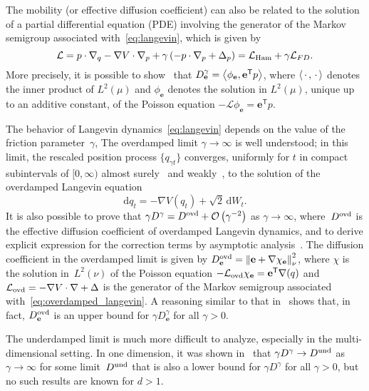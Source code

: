 \documentclass[11pt,a4paper]{article}
\newcommand{\laplacian}{\Delta}
\newcommand{\dummy}{\,\cdot\,}
\newcommand{\grad}{\nabla}
\newcommand{\vect}[1]{\boldsymbol{\mathbf #1}}
\renewcommand{\d}{\mathrm d}
\renewcommand{\t}{\mathsf T}
\theoremstyle{plain}
\numberwithin{equation}{section}
\begin{document}
The mobility (or effective diffusion coefficient)
can also be related to the solution of a partial differential equation (PDE) involving the generator of the Markov semigroup associated with~\eqref{eq:langevin},
which is given by
\begin{equation}
    \label{eq:decomposition_generator}
    \mathcal L
    = p \cdot \grad_q - \grad V \cdot \grad_p + \gamma \left( - p \cdot \grad_p + \laplacian_p \right)
    = \mathcal L_{\rm Ham} + \gamma \mathcal L_{FD}.
\end{equation}
More precisely, it is possible to  show~\cite{pavliotis2008multiscale,MR3509213} that $D^{\gamma}_{\vect e} = \ip{\phi_{\vect e}}{\vect e^\t p}$,
where $\ip{\dummy}{\dummy}$ denotes the inner product of $L^2(\mu)$ and $\phi_{\vect e}$ denotes the solution in $L^2(\mu)$,
unique up to an additive constant,
of the Poisson equation $- \mathcal L \phi_{\vect e} = \vect e^\t p$.

The behavior of Langevin dynamics~\eqref{eq:langevin} depends on the value of the friction parameter~$\gamma$,
The overdamped limit $\gamma \to \infty$ is well understood;
in this limit, the rescaled position process $\{q_{\gamma t}\}$
converges, uniformly for $t$ in compact subintervals of $[0, \infty)$ almost surely~\cite{MR0214150} and weakly~\cite{MR4054345},
to the solution of the overdamped Langevin equation
\begin{equation}
    \label{eq:overdamped_langevin}
    \d q_t = - \grad V(q_t) + \sqrt{2} \, \d W_t.
\end{equation}
It is also possible to prove that $\gamma D^{\gamma} = D^{\rm ovd} + \bigo{\gamma^{-2}}$ as $\gamma \to \infty$,
where~$D^{\rm ovd}$ is the effective diffusion coefficient of overdamped Langevin dynamics,
and to derive explicit expression for the correction terms by asymptotic analysis~\cite{MR2394704}.
The diffusion coefficient in the overdamped limit is given by $D^{\rm ovd}_{\vect e} = \norm{\vect e + \grad \chi_{\vect e}}[\nu]^2$,
where $\chi$ is the solution in~$L^2(\nu)$ of the Poisson equation $- \mathcal L_{\rm ovd} \chi_{\vect e} = \vect e^\t \grad(q)$
and $\mathcal L_{\rm ovd} = - \grad V \cdot \grad + \laplacian$ is the generator of the Markov semigroup associated with~\eqref{eq:overdamped_langevin}.
A reasoning similar to that in~\cite[Proposition 4.1]{MR2394704} shows that,
in fact, $D^{\rm ovd}_{\vect e}$ is an upper bound for $\gamma D^{\gamma}_{\vect e}$ for all $\gamma > 0$.

The underdamped limit is much more difficult to analyze,
especially in the multi-dimensional setting.
In one dimension, it was shown in~\cite{MR2394704} that $\gamma D^{\gamma} \to D^{\rm und}$ as $\gamma \to \infty$ for some limit~$D^{\rm und}$ 
that is also a lower bound for $\gamma D^{\gamma}$ for all $\gamma > 0$,
but no such results are known for $d > 1$.
\end{document}
